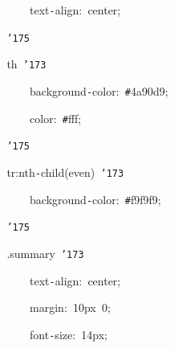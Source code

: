 \documentclass[a4paper,10pt]{article}
\def\mc{\relax}
\begin{document}
\noindent
\mbox{}{\tt\mc \ }{\tt\mc \ }{\tt\mc \ }{\tt\mc \ }{\tt\mc \ }{\tt\mc \ }{\tt\mc \ }{\tt\mc \ }{\tt\mc \ }{\tt\mc \ }{\tt\mc \ }{\tt\mc \ }text{\tt -}align:{\tt\mc \ }center;

\noindent
\mbox{}{\tt\mc \ }{\tt\mc \ }{\tt\mc \ }{\tt\mc \ }{\tt\mc \ }{\tt\mc \ }{\tt\mc \ }{\tt\mc \ }{\tt\char'175}

\noindent
\mbox{}{\tt\mc \ }{\tt\mc \ }{\tt\mc \ }{\tt\mc \ }{\tt\mc \ }{\tt\mc \ }{\tt\mc \ }{\tt\mc \ }th{\tt\mc \ }{\tt\char'173}

\noindent
\mbox{}{\tt\mc \ }{\tt\mc \ }{\tt\mc \ }{\tt\mc \ }{\tt\mc \ }{\tt\mc \ }{\tt\mc \ }{\tt\mc \ }{\tt\mc \ }{\tt\mc \ }{\tt\mc \ }{\tt\mc \ }background{\tt -}color:{\tt\mc \ }{\tt\#}4a90d9;

\noindent
\mbox{}{\tt\mc \ }{\tt\mc \ }{\tt\mc \ }{\tt\mc \ }{\tt\mc \ }{\tt\mc \ }{\tt\mc \ }{\tt\mc \ }{\tt\mc \ }{\tt\mc \ }{\tt\mc \ }{\tt\mc \ }color:{\tt\mc \ }{\tt\#}fff;

\noindent
\mbox{}{\tt\mc \ }{\tt\mc \ }{\tt\mc \ }{\tt\mc \ }{\tt\mc \ }{\tt\mc \ }{\tt\mc \ }{\tt\mc \ }{\tt\char'175}

\noindent
\mbox{}{\tt\mc \ }{\tt\mc \ }{\tt\mc \ }{\tt\mc \ }{\tt\mc \ }{\tt\mc \ }{\tt\mc \ }{\tt\mc \ }tr:nth{\tt -}child(even){\tt\mc \ }{\tt\char'173}

\noindent
\mbox{}{\tt\mc \ }{\tt\mc \ }{\tt\mc \ }{\tt\mc \ }{\tt\mc \ }{\tt\mc \ }{\tt\mc \ }{\tt\mc \ }{\tt\mc \ }{\tt\mc \ }{\tt\mc \ }{\tt\mc \ }background{\tt -}color:{\tt\mc \ }{\tt\#}f9f9f9;

\noindent
\mbox{}{\tt\mc \ }{\tt\mc \ }{\tt\mc \ }{\tt\mc \ }{\tt\mc \ }{\tt\mc \ }{\tt\mc \ }{\tt\mc \ }{\tt\char'175}

\noindent
\mbox{}{\tt\mc \ }{\tt\mc \ }{\tt\mc \ }{\tt\mc \ }{\tt\mc \ }{\tt\mc \ }{\tt\mc \ }{\tt\mc \ }.summary{\tt\mc \ }{\tt\char'173}

\noindent
\mbox{}{\tt\mc \ }{\tt\mc \ }{\tt\mc \ }{\tt\mc \ }{\tt\mc \ }{\tt\mc \ }{\tt\mc \ }{\tt\mc \ }{\tt\mc \ }{\tt\mc \ }{\tt\mc \ }{\tt\mc \ }text{\tt -}align:{\tt\mc \ }center;

\noindent
\mbox{}{\tt\mc \ }{\tt\mc \ }{\tt\mc \ }{\tt\mc \ }{\tt\mc \ }{\tt\mc \ }{\tt\mc \ }{\tt\mc \ }{\tt\mc \ }{\tt\mc \ }{\tt\mc \ }{\tt\mc \ }margin:{\tt\mc \ }10px{\tt\mc \ }0;

\noindent
\mbox{}{\tt\mc \ }{\tt\mc \ }{\tt\mc \ }{\tt\mc \ }{\tt\mc \ }{\tt\mc \ }{\tt\mc \ }{\tt\mc \ }{\tt\mc \ }{\tt\mc \ }{\tt\mc \ }{\tt\mc \ }font{\tt -}size:{\tt\mc \ }14px;
\end{document}
